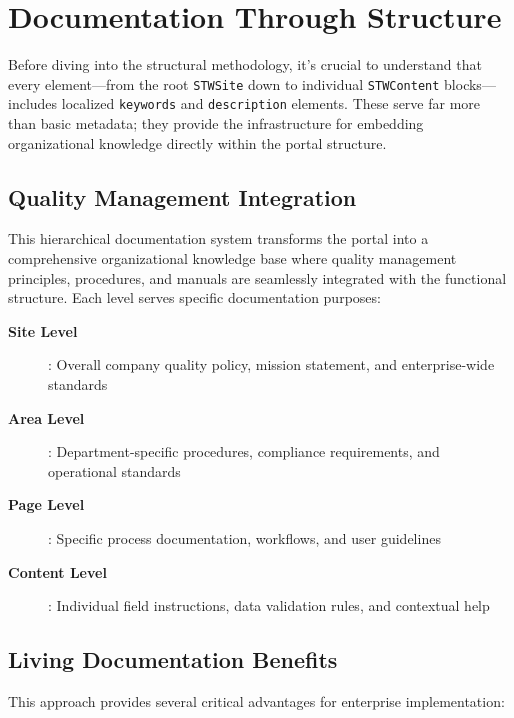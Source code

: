 \section{Documentation Through Structure}
\label{sec:documentation-structure}

Before diving into the structural methodology, it's crucial to understand that every \wbdl{} element—from the root \texttt{STWSite} down to individual \texttt{STWContent} blocks—includes localized \texttt{keywords} and \texttt{description} elements. These serve far more than basic metadata; they provide the infrastructure for embedding organizational knowledge directly within the portal structure.

\subsection{Quality Management Integration}
\label{sec:quality-management}

This hierarchical documentation system transforms the portal into a comprehensive organizational knowledge base where quality management principles, procedures, and manuals are seamlessly integrated with the functional structure. Each level serves specific documentation purposes:

\begin{description}
\item[\textbf{Site Level}]: Overall company quality policy, mission statement, and enterprise-wide standards
\item[\textbf{Area Level}]: Department-specific procedures, compliance requirements, and operational standards
\item[\textbf{Page Level}]: Specific process documentation, workflows, and user guidelines
\item[\textbf{Content Level}]: Individual field instructions, data validation rules, and contextual help
\end{description}

\subsection{Living Documentation Benefits}
\label{sec:living-documentation}

This approach provides several critical advantages for enterprise implementation:

